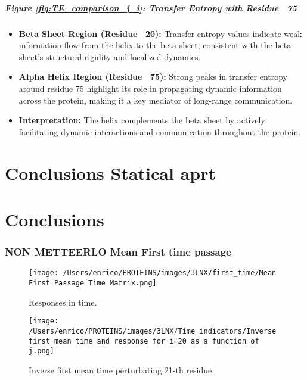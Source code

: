\documentclass[English, Lau, oneside]{sapthesis}
\begin{document}
\paragraph{Figure \ref{fig:TE_comparison_j_i}: Transfer Entropy with Residue ~75}
\begin{itemize}
    \item \textbf{Beta Sheet Region (Residue ~20):} Transfer entropy values indicate weak information flow from the helix to the beta sheet, consistent with the beta sheet's structural rigidity and localized dynamics.
    \item \textbf{Alpha Helix Region (Residue ~75):} Strong peaks in transfer entropy around residue 75 highlight its role in propagating dynamic information across the protein, making it a key mediator of long-range communication.
    \item \textbf{Interpretation:} The helix complements the beta sheet by actively facilitating dynamic interactions and communication throughout the protein.
\end{itemize}



\newpage
\newpage
\chapter{Conclusions Statical aprt}


\chapter{Conclusions}



\subsection*{NON METTEERLO Mean First time passage}
\begin{figure}[h!]
    \centering
    \texttt{[image: /Users/enrico/PROTEINS/images/3LNX/first\_time/Mean First Passage Time Matrix.png]}
    \caption{Responses in time.}
\end{figure}

\begin{figure}[h!]
    \centering
    \texttt{[image: /Users/enrico/PROTEINS/images/3LNX/Time\_indicators/Inverse first mean time and response for i=20 as a function of j.png]}
    \caption{Inverse first mean time perturbating 21-th residue.}
\end{figure}
\end{document}
